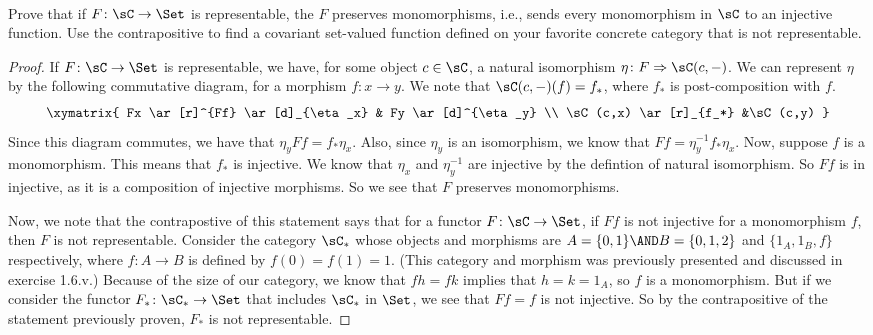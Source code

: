 \documentclass[main.tex]{subfiles}
\begin{document}
\paragraph{}
\begin{exercise}
	 Prove that if $F\colon \sC \rightarrow \Set$ is representable, the $F$ 
	 preserves monomorphisms, i.e., sends every monomorphism in $\sC$ to 
	 an injective function. Use the contrapositive to find a covariant 
	 set-valued function defined on your favorite concrete category that is not 
	 representable. 
\end{exercise}

\begin{proof}

If $F \colon \sC \rightarrow  \Set$ is representable, we have, for some object 
$c \in \sC$, a natural isomorphism $\eta\colon F \Rightarrow \sC(c,-)$. We can 
represent $\eta$ by the following commutative diagram, for a morphism $f\colon 
x\rightarrow y$. We note that $\sC(c,-)(f) = f_*$, where $f_*$ is 
post-composition with $f$.
$$
\xymatrix{ 
Fx 
\ar[r]^{Ff} 
\ar[d]_{\eta_x} 
& Fy
\ar[d]^{\eta_y} 
\\ 
\sC(c,x) 
\ar[r]_{f_*} 
&\sC(c,y)
}  
$$
Since this diagram commutes, we have that $\eta_yFf = f_* \eta_x$.  Also, since 
$\eta_y$ is an isomorphism, we know that $Ff = \eta_y^{-1}f_*\eta_x$. Now, 
suppose $f$ is a monomorphism. This means that $f_*$ is injective. We know that 
$\eta_x$ and $\eta_y^{-1}$ are injective by the defintion of natural 
isomorphism. So $Ff$ is in injective, as it is a composition of injective 
morphisms. So we see that $F$ preserves monomorphisms. 

Now, we note that the contrapostive of this statement says that for a functor 
$F\colon \sC \rightarrow \Set$, if $Ff$ is not injective for a monomorphism 
$f$, then 
$F$ is not representable. Consider the category $\sC_*$ whose objects and 
morphisms are $ A =\{0,1\} \AND B = \{0,1,2\} $  and $\{1_A, 1_B, f\}$ respectively, where $f 
 \colon A \rightarrow B$ is defined by $f(0)=f(1)= 1.$ (This category and 
morphism was previously presented and discussed in exercise 1.6.v.) Because of 
the size of our category, we know that $fh = fk$ implies that $h = k = 1_A$, so 
$f$ is a monomorphism. But if we consider the functor $F_*\colon \sC_* \rightarrow 
\Set$ that includes $\sC_*$ in $\Set$, we see that $Ff = f$ is not injective. So 
by the contrapositive of the statement previously proven, $F_*$ is not 
representable. 
\end{proof}
\end{document}
